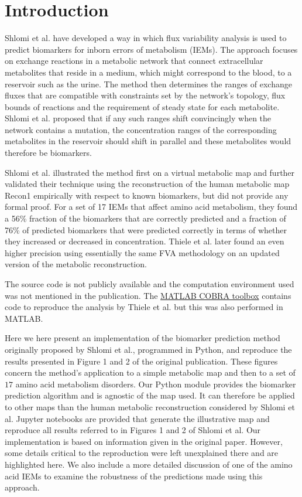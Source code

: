 \documentclass[10pt,a4paper,onecolumn]{article}
\begin{document}
\section{Introduction}\label{introduction}

Shlomi et al. \autocite{Shlomi2009} have developed a way in which flux
variability analysis \autocite{Mahadevan2003} is used to predict
biomarkers for inborn errors of metabolism (IEMs). The approach focuses
on exchange reactions in a metabolic network that connect extracellular
metabolites that reside in a medium, which might correspond to the
blood, to a reservoir such as the urine. The method then determines the
ranges of exchange fluxes that are compatible with constraints set by
the network's topology, flux bounds of reactions and the requirement of
steady state for each metabolite. Shlomi et al. proposed that if any
such ranges shift convincingly when the network contains a mutation, the
concentration ranges of the corresponding metabolites in the reservoir
should shift in parallel and these metabolites would therefore be
biomarkers.

Shlomi et al. illustrated the method first on a virtual metabolic map
and further validated their technique using the reconstruction of the
human metabolic map Recon1 \autocite{Duarte2007} empirically with
respect to known biomarkers, but did not provide any formal proof. For a
set of 17 IEMs that affect amino acid metabolism, they found a 56\%
fraction of the biomarkers that are correctly predicted and a fraction
of 76\% of predicted biomarkers that were predicted correctly in terms
of whether they increased or decreased in concentration. Thiele et al.
\autocite{Thiele2013} later found an even higher precision using
essentially the same FVA methodology on an updated version of the
metabolic reconstruction.

The source code is not publicly available and the computation
environment used was not mentioned in the publication. The
\href{https://github.com/opencobra/cobratoolbox}{MATLAB COBRA toolbox}
contains code to reproduce the analysis by Thiele et al. but this was
also performed in MATLAB.

Here we here present an implementation of the biomarker prediction
method originally proposed by Shlomi et al., programmed in Python, and
reproduce the results presented in Figure 1 and 2 of the original
publication. These figures concern the method's application to a simple
metabolic map and then to a set of \(17\) amino acid metabolism
disorders. Our Python module provides the biomarker prediction algorithm
and is agnostic of the map used. It can therefore be applied to other
maps than the human metabolic reconstruction considered by Shlomi et al.
Jupyter notebooks are provided that generate the illustrative map and
reproduce all results referred to in Figures 1 and 2 of Shlomi et al.
Our implementation is based on information given in the original paper.
However, some details critical to the reproduction were left unexplained
there and are highlighted here. We also include a more detailed
discussion of one of the amino acid IEMs to examine the robustness of
the predictions made using this approach.
\end{document}
